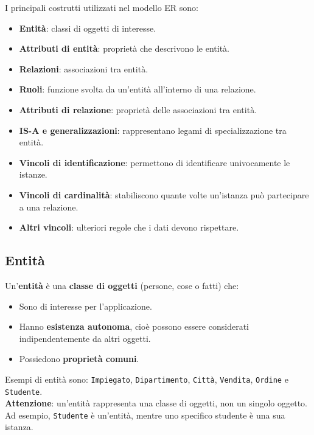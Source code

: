 I principali costrutti utilizzati nel modello ER sono:
\begin{itemize}
    \item \textbf{Entità}: classi di oggetti di interesse.
    \item \textbf{Attributi di entità}: proprietà che descrivono le entità.
    \item \textbf{Relazioni}: associazioni tra entità.
    \item \textbf{Ruoli}: funzione svolta da un'entità all'interno di una relazione.
    \item \textbf{Attributi di relazione}: proprietà delle associazioni tra entità.
    \item \textbf{IS-A e generalizzazioni}: rappresentano legami di specializzazione tra entità.
    \item \textbf{Vincoli di identificazione}: permettono di identificare univocamente le istanze.
    \item \textbf{Vincoli di cardinalità}: stabiliscono quante volte un'istanza può partecipare a una relazione.
    \item \textbf{Altri vincoli}: ulteriori regole che i dati devono rispettare.
\end{itemize}

\subsection{Entità}

Un'\textbf{entità} è una \textbf{classe di oggetti} (persone, cose o fatti) che:
\begin{itemize}
    \item Sono di interesse per l'applicazione.
    \item Hanno \textbf{esistenza autonoma}, cioè possono essere considerati indipendentemente da altri oggetti.
    \item Possiedono \textbf{proprietà comuni}.
\end{itemize}
\noindent Esempi di entità sono: \texttt{Impiegato}, \texttt{Dipartimento}, \texttt{Città}, \texttt{Vendita}, \texttt{Ordine} e \texttt{Studente}.\\
\textbf{Attenzione}: un'entità rappresenta una classe di oggetti, non un singolo oggetto. Ad esempio, \texttt{Studente} è un'entità, mentre uno specifico studente è una sua istanza.

